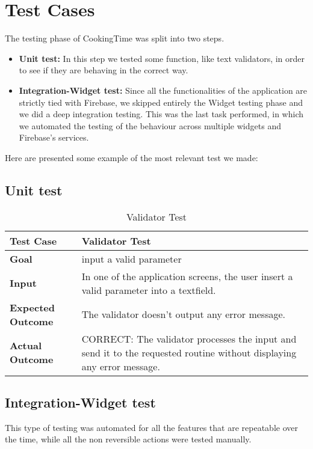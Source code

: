 \chapter{Test Cases}
The testing phase of CookingTime was split into two steps.

\begin{itemize}
	\item \textbf{Unit test:} In this step we tested some function, like text validators, in order to see if they are behaving in the correct way.
	\item \textbf{Integration-Widget test:} Since all the functionalities of the application are strictly tied with Firebase, we skipped entirely the Widget testing phase and we did a deep integration testing.
	This was the last task performed, in which we automated the testing of the behaviour across multiple widgets and Firebase's services.
\end{itemize}

Here are presented some example of the most relevant test we made:

\section{Unit test}
\begin{table}[H]
	\centering
	\begin{tabular}{|l|l|}
	\hline
	\textbf{Test Case}& Validator Test\\
	\hline
	\textbf{Goal}& input a valid parameter\\
	\hline
	\textbf{Input}& 
	\begin{minipage}{.7\linewidth}
	In one of the application screens, the user insert a valid parameter into a textfield.
	\end{minipage}\\
	\hline
	\textbf{Expected Outcome}& The validator doesn't output any error message.\\
	\hline
	\textbf{Actual Outcome}& 
	\begin{minipage}{.7\linewidth}
	CORRECT: The validator processes the input and send it to the requested routine without displaying any error message.
	\end{minipage}\\
	\hline	
	\end{tabular}
	\caption{Validator Test}
\end{table}

\section{Integration-Widget test}
This type of testing was automated for all the features that are repeatable over the time, while all the non reversible actions were tested manually.

